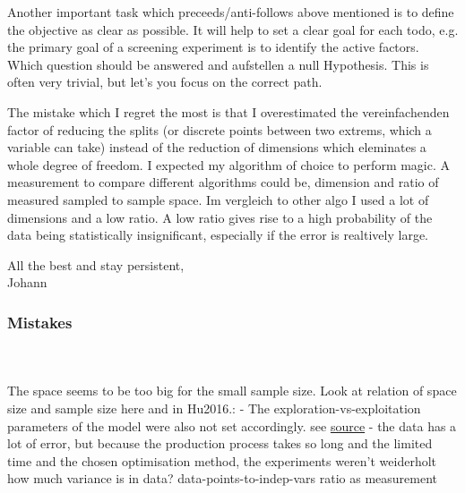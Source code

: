 Another important task which preceeds/anti-follows above mentioned is to define the objective as clear as possible.  
It will help to set a clear goal for each todo, e.g. 
the primary goal of a screening experiment is to identify the active factors.\cite{miller2001using}
Which question should be answered and aufstellen a null Hypothesis. 
This is often very trivial, but let's you focus on the correct path. 

The mistake which I regret the most is that I overestimated the vereinfachenden factor of reducing the splits (or discrete points between two extrems, which a variable can take) instead of the reduction of dimensions which eleminates a whole degree of freedom. 
I expected my algorithm of choice to perform magic. 
A measurement to compare different algorithms could be, dimension and ratio of measured sampled to sample space. 
Im vergleich to other algo I used a lot of dimensions and a low ratio.
A low ratio gives rise to a high probability of the data being statistically insignificant, especially if the error is realtively large. 

All the best and stay persistent, \\  
Johann \\
\fi


\subsubsection{Mistakes} 
\\
\\
The space seems to be too big for the small sample size.
Look at relation of space size and sample size here and in Hu2016.:
%
- The exploration-vs-exploitation parameters of the model were also not set accordingly.
see \href{https://search.r-project.org/CRAN/refmans/emma/html/emma.html}{source}
%
- the data has a lot of error, but because the production process takes so long and the 
limited time and the chosen optimisation method, the experiments weren't weiderholt
how much variance is in data? 
%
data-points-to-indep-vars ratio as measurement

